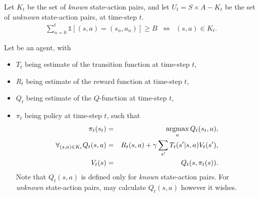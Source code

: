 \begin{defn}
Let $K_t$ be the set of \emph{known} state-action pairs, and let $U_t = S \times A - K_t$ be the set of \emph{unknown} state-action pairs, at time-step $t$.
\begin{eqnarray}
\sum_{n=0}^t \mathbb{1}\left[(s,a) = (s_n,a_n)\right] \geq B & \Longleftrightarrow & (s,a) \in K_t.
\end{eqnarray}
\end{defn}

\begin{defn}
Let \A be an agent, with
\begin{itemize}
\item
$T_t$ being \As estimate of the transition function at time-step $t$,
\item
$R_t$ being \As estimate of the reward function at time-step $t$,
\item
$Q_t$ being \As estimate of the $Q$-function at time-step $t$,
\item
$\pi_t$ being \As policy at time-step $t$, such that
\begin{eqnarray}
\pi_t(s_t) &=& \argmax_a Q_t(s_t,a),\\
\forall_{(s,a)\in K_t} Q_t(s,a) &=& R_t(s,a) + \gamma \sum_{s'} T_t(s'|s,a) V_t(s'),\\
V_t(s) &=& Q_t(s,\pi_t(s)).
\end{eqnarray}
Note that $Q_t(s,a)$ is defined only for \emph{known} state-action pairs. For \emph{unknown} state-action pairs, \A may calculate $Q_t(s,a)$ however it wishes.
\end{itemize}
\end{defn}

